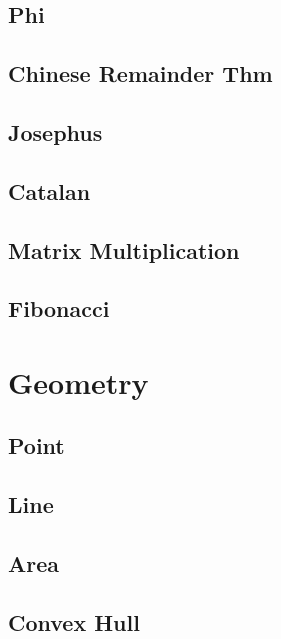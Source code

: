     \subsection{Phi}
        
    \subsection{Chinese Remainder Thm}
        
    \subsection{Josephus}
        
    \subsection{Catalan}
        
    \subsection{Matrix Multiplication}
        
    \subsection{Fibonacci}
        

\section{Geometry}
    \subsection{Point}
        
    \subsection{Line}
        
    \subsection{Area}
        
    \subsection{Convex Hull}
        
